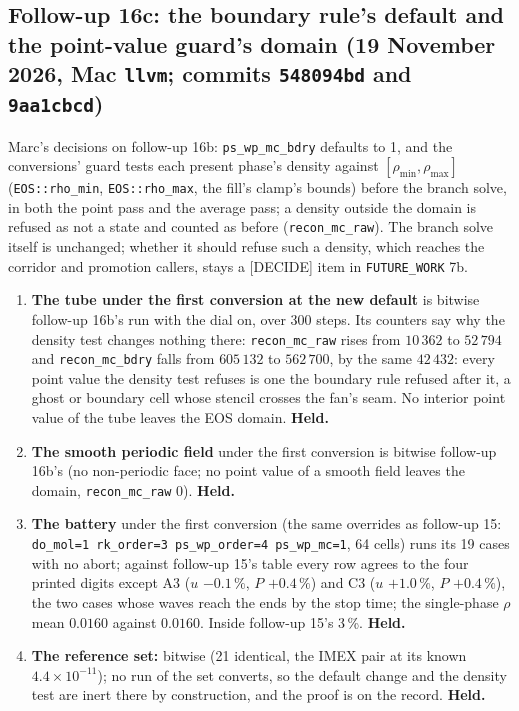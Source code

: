 \documentclass[11pt,a4paper]{article}
\newcommand{\code}[1]{\texttt{\small #1}}
\begin{document}
\subsection{Follow-up 16c: the boundary rule's default and the point-value guard's domain (19 November 2026, Mac \code{llvm}; commits \code{548094bd} and \code{9aa1cbcd})}

Marc's decisions on follow-up 16b: \code{ps\_wp\_mc\_bdry} defaults to
1, and the conversions' guard tests each present phase's density
against $[\rho_{\min}, \rho_{\max}]$ (\code{EOS::rho\_min},
\code{EOS::rho\_max}, the fill's clamp's bounds) before the branch
solve, in both the point pass and the average pass; a density outside
the domain is refused as not a state and counted as before
(\code{recon\_mc\_raw}).  The branch solve itself is unchanged; whether
it should refuse such a density, which reaches the corridor and
promotion callers, stays a [DECIDE] item in \code{FUTURE\_WORK} 7b.

\begin{enumerate}[nosep]
\item \textbf{The tube under the first conversion at the new default}
      is bitwise follow-up 16b's run with the dial on, over 300 steps.
      Its counters say why the density test changes nothing there:
      \code{recon\_mc\_raw} rises from $10\,362$ to $52\,794$ and
      \code{recon\_mc\_bdry} falls from $605\,132$ to $562\,700$, by the
      same $42\,432$: every point value the density test refuses is one
      the boundary rule refused after it, a ghost or boundary cell whose
      stencil crosses the fan's seam.  No interior point value of the
      tube leaves the EOS domain.  \textbf{Held.}
\item \textbf{The smooth periodic field} under the first conversion is
      bitwise follow-up 16b's (no non-periodic face; no point value of a
      smooth field leaves the domain, \code{recon\_mc\_raw} 0).
      \textbf{Held.}
\item \textbf{The battery} under the first conversion (the same
      overrides as follow-up 15: \code{do\_mol=1 rk\_order=3
      ps\_wp\_order=4 ps\_wp\_mc=1}, 64 cells) runs its 19 cases with no
      abort; against follow-up 15's table every row agrees to the four
      printed digits except A3 ($u$ $-0.1\,\%$, $P$ $+0.4\,\%$) and C3
      ($u$ $+1.0\,\%$, $P$ $+0.4\,\%$), the two cases whose waves reach
      the ends by the stop time; the single-phase $\rho$ mean $0.0160$
      against $0.0160$.  Inside follow-up 15's 3\,\%.  \textbf{Held.}
\item \textbf{The reference set:} bitwise (21 identical, the IMEX pair at its known $4.4\times10^{-11}$); no run of the set converts, so the default change and the density test are inert there by construction, and the proof is on the record.  \textbf{Held.}
\end{enumerate}
\end{document}
